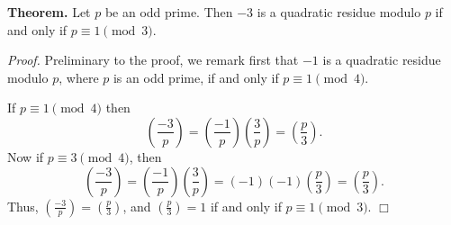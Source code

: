 \documentclass[12pt]{article}
\begin{document}
\textbf{Theorem.}
Let $p$ be an odd prime. Then $-3$ is a quadratic residue modulo $p$ if and only if $p \equiv 1\pmod{3}$.

\emph{Proof.}
Preliminary to the proof, we remark first that $-1$ is a quadratic residue modulo $p$, where $p$ is an odd prime, if and only if $p \equiv 1\pmod{4}$.

If $p \equiv 1\pmod{4}$ then
\[\left(\frac{-3}{p}\right) = \left(\frac{-1}{p}\right)\left(\frac{3}{p}\right) = \left(\frac{p}{3}\right).\]
Now if $p \equiv 3\pmod{4}$, then 
\[ \left(\frac{-3}{p}\right) = \left(\frac{-1}{p}\right)\left(\frac{3}{p}\right) = (-1)(-1)\left(\frac{p}{3}\right) = \left(\frac{p}{3}\right).\] 
Thus, $\displaystyle \left(\frac{-3}{p}\right) = \left(\frac{p}{3}\right)$, and $\displaystyle \left(\frac{p}{3}\right)=1$ if and only if $p \equiv 1\pmod{3}$. $\Box$


 
\end{document}
